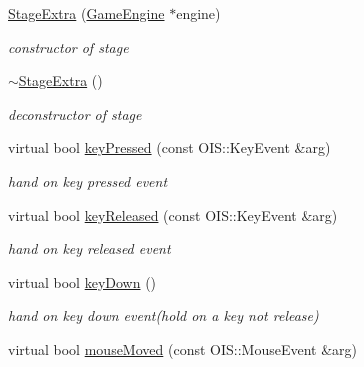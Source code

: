 \begin{DoxyCompactItemize}
\item 
\hypertarget{class_stage_extra_a59b589cb956e97a6f98984938a9d6ac0}{
\hyperlink{class_stage_extra_a59b589cb956e97a6f98984938a9d6ac0}{StageExtra} (\hyperlink{class_game_engine}{GameEngine} $\ast$engine)}
\label{class_stage_extra_a59b589cb956e97a6f98984938a9d6ac0}

\begin{DoxyCompactList}\small\item\em constructor of stage \end{DoxyCompactList}\item 
\hypertarget{class_stage_extra_a2a1450b01dc533b8e9ff21761f81d93c}{
\hyperlink{class_stage_extra_a2a1450b01dc533b8e9ff21761f81d93c}{$\sim$StageExtra} ()}
\label{class_stage_extra_a2a1450b01dc533b8e9ff21761f81d93c}

\begin{DoxyCompactList}\small\item\em deconstructor of stage \end{DoxyCompactList}\item 
\hypertarget{class_stage_extra_ac75d0d02d726e5beded7a48195192937}{
virtual bool \hyperlink{class_stage_extra_ac75d0d02d726e5beded7a48195192937}{keyPressed} (const OIS::KeyEvent \&arg)}
\label{class_stage_extra_ac75d0d02d726e5beded7a48195192937}

\begin{DoxyCompactList}\small\item\em hand on key pressed event \end{DoxyCompactList}\item 
\hypertarget{class_stage_extra_a6df94aba379a6798813dfe8c41f6f019}{
virtual bool \hyperlink{class_stage_extra_a6df94aba379a6798813dfe8c41f6f019}{keyReleased} (const OIS::KeyEvent \&arg)}
\label{class_stage_extra_a6df94aba379a6798813dfe8c41f6f019}

\begin{DoxyCompactList}\small\item\em hand on key released event \end{DoxyCompactList}\item 
\hypertarget{class_stage_extra_afbff98919b01f6bff48d590a80c8bfba}{
virtual bool \hyperlink{class_stage_extra_afbff98919b01f6bff48d590a80c8bfba}{keyDown} ()}
\label{class_stage_extra_afbff98919b01f6bff48d590a80c8bfba}

\begin{DoxyCompactList}\small\item\em hand on key down event(hold on a key not release) \end{DoxyCompactList}\item 
\hypertarget{class_stage_extra_a90ad0d560da1898a5486d37209db485c}{
virtual bool \hyperlink{class_stage_extra_a90ad0d560da1898a5486d37209db485c}{mouseMoved} (const OIS::MouseEvent \&arg)}
\label{class_stage_extra_a90ad0d560da1898a5486d37209db485c}


\end{DoxyCompactItemize}

